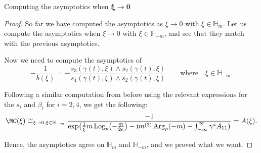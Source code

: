 \begin{subsubsection}{Computing the asymptotics when $\boldsymbol{\xi \to 0}$}
\begin{proof}
So far we have computed the asymptotics as $\xi \to 0$ with $\xi \in \mathbb{H}_m$. Let us compute the asymptotics when $\xi \to 0$ with $\xi \in \mathbb{H}_{-m}$, and see that they match with the previous asymptotics.

Now we need to compute the asymptotics of
\begin{equation*}
-\frac{1}{b(\xi)}=-\frac{s_3(\gamma(t),\xi)\wedge s_2 (\gamma(t),\xi)}{s_4(\gamma(t),\xi)\wedge s_2(\gamma(t),\xi)}\qquad \text{where} \quad \xi \in \mathbb{H}_{-m}.
\end{equation*}

Following a similar computation from before using the relevant expressions for the $s_i$ and $\beta_i$ for $i=2,4$, we get the following:
\begin{equation*}
 \MC(\xi)\cong_{\xi \to 0, \xi \in \mathbb{H}_{-m}} \frac{-1}{\exp \bigl(\frac{1}{\xi}m \operatorname{Log}_p\bigl(-\frac{m}{2e}\bigr)-{\rm i}m^{(3)}\operatorname{Arg}_p(-m)-\int_{-\infty}^{\infty}\gamma^*A_{11}\bigr)}=A(\xi).
\end{equation*}

Hence, the asymptotics agree on $\mathbb{H}_m$ and $\mathbb{H}_{-m}$, and we proved what we want.
\end{proof}
\end{subsubsection}
